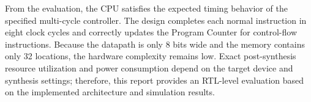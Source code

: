 From the evaluation, the CPU satisfies the expected timing behavior of the specified multi-cycle controller. The design completes each normal instruction in eight clock cycles and correctly updates the Program Counter for control-flow instructions. Because the datapath is only 8 bits wide and the memory contains only 32 locations, the hardware complexity remains low. Exact post-synthesis resource utilization and power consumption depend on the target device and synthesis settings; therefore, this report provides an RTL-level evaluation based on the implemented architecture and simulation results.
